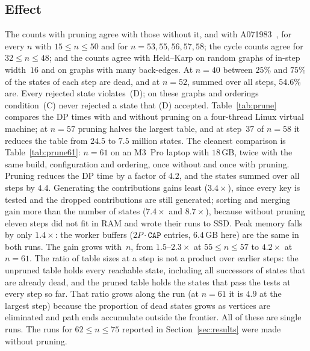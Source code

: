 \documentclass[12pt]{article}
\theoremstyle{definition}
\begin{document}
\subsection{Effect}

The counts with pruning agree with those without it, and with
A071983~\cite{OEIS-A071983}, for every $n$ with $15\le n\le 50$ and for
$n=53,55,56,57,58$; the cycle counts agree for $32\le n\le 48$; and the
counts agree with Held--Karp on random graphs of in-step width~$16$ and on
graphs with many back-edges.
At $n=40$ between $25\%$ and $75\%$ of the states of each step are dead,
and at $n=52$, summed over all steps, $54.6\%$ are.
Every rejected state violates~(D); on these graphs and orderings
condition~(C) never rejected a state that (D) accepted.
Table~\ref{tab:prune} compares the DP times with and without pruning on a
four-thread Linux virtual machine; at $n=57$ pruning halves the largest
table, and at step~$37$ of $n=58$ it reduces the table from $24.5$ to $7.5$
million states.
The cleanest comparison is Table~\ref{tab:prune61}: $n=61$ on an M3~Pro
laptop with $18$\,GB, twice with the same build, configuration and
ordering, once without and once with pruning.
Pruning reduces the DP time by a factor of $4.2$, and the states summed
over all steps by $4.4$.
Generating the contributions gains least ($3.4\times$), since every key is
tested and the dropped contributions are still generated; sorting and
merging gain more than the number of states ($7.4\times$ and $8.7\times$),
because without pruning eleven steps did not fit in RAM and wrote their
runs to SSD.
Peak memory falls by only $1.4\times$: the worker buffers
($2P\cdot\texttt{CAP}$ entries, $6.4$\,GB here) are the same in both runs.
The gain grows with~$n$, from $1.5$--$2.3\times$ at $55\le n\le 57$ to
$4.2\times$ at $n=61$.
The ratio of table sizes at a step is not a product over earlier steps:
the unpruned table holds every reachable state, including all successors
of states that are already dead, and the pruned table holds the states
that pass the tests at every step so far.
That ratio grows along the run (at $n=61$ it is $4.9$ at the largest
step) because the proportion of dead states grows as vertices are
eliminated and path ends accumulate outside the frontier.
All of these are single runs.
The runs for $62\le n\le 75$ reported in Section~\ref{sec:results} were made
without pruning.
\end{document}

